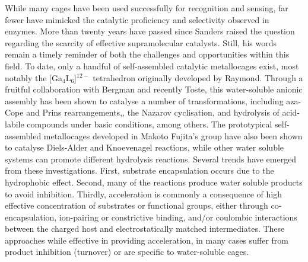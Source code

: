 \documentclass[../../main.tex]{subfiles}
\begin{document}
While many cages have been used successfully for recognition and sensing, far fewer have mimicked the catalytic proficiency and selectivity observed in enzymes. More than twenty years have passed since Sanders raised the question regarding the scarcity of effective supramolecular catalysts.\cite{Sanders1998} Still, his words remain a timely reminder of both the challenges and opportunities within this field. To date, only a handful of self-assembled catalytic metallocages exist,\cite{Fang2019} most notably the [Ga$_4$L$_6$]$^{12-}$ tetrahedron originally developed by Raymond.\cite{Caulder1998} Through a fruitful collaboration with Bergman and recently Toste, this water-soluble anionic assembly has been shown to catalyse a number of transformations, including aza-Cope\cite{Fiedler2004, Brown2009} and Prins rearrangements,\cite{HartCooper2015, Kaphan2015}, the Nazarov cyclisation,\cite{Hastings2010} and hydrolysis of acid-labile compounds under basic conditions,\cite{Pluth2007} among others.\cite{Fang2019} The prototypical self-assembled metallocages developed in Makoto Fujita's group have also been shown to catalyse Diels-Alder and Knoevenagel reactions,\cite{Yoshizawa2006, Murase2011} while other water soluble systems can promote different hydrolysis reactions.\cite{Bolliger2013, Cullen2016, Cullen2018} Several trends have emerged from these investigations. First, substrate encapsulation occurs due to the hydrophobic effect. Second, many of the reactions produce water soluble products to avoid inhibition. Thirdly, acceleration is commonly a consequence of high effective concentration of substrates or functional groups, either through co-encapsulation, ion-pairing or constrictive binding, and/or coulombic interactions between the charged host and electrostatically matched intermediates.\cite{Chakraborty2019, Goehry2015} These approaches while effective in providing acceleration, in many cases suffer from product inhibition (turnover) or are specific to water-soluble cages. 
\end{document}
